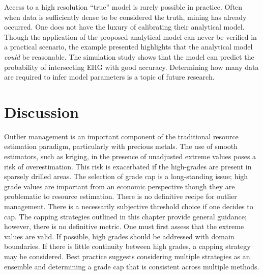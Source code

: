

Access to a high resolution ``true'' model is rarely possible in practice. Often when data is sufficiently dense to be considered the truth, mining has already occurred. One does not have the luxury of calibrating their analytical model. Though the application of the proposed analytical model can never be verified in a practical scenario, the example presented highlights that the analytical model \emph{could} be reasonable. The simulation study shows that the model can predict the probability of intersecting \gls{EHG} with good accuracy. Determining how many data are required to infer model parameters is a topic of future research.

\FloatBarrier
\section{Discussion}
\label{sec:02discuss}

Outlier management is an important component of the traditional resource estimation paradigm, particularly with precious metals. The use of smooth estimators, such as kriging, in the presence of unadjusted extreme values poses a risk of overestimation. This risk is exacerbated if the high-grades are present in sparsely drilled areas. The selection of grade cap is a long-standing issue; high grade values are important from an economic perspective though they are problematic to resource estimation. There is no definitive recipe for outlier management. There is a necessarily subjective threshold choice if one decides to cap. The capping strategies outlined in this chapter provide general guidance; however, there is no definitive metric. One must first assess that the extreme values are valid. If possible, high grades should be addressed with domain boundaries. If there is little continuity between high grades, a capping strategy may be considered. Best practice suggests considering multiple strategies as an ensemble and determining a grade cap that is consistent across multiple methods.

